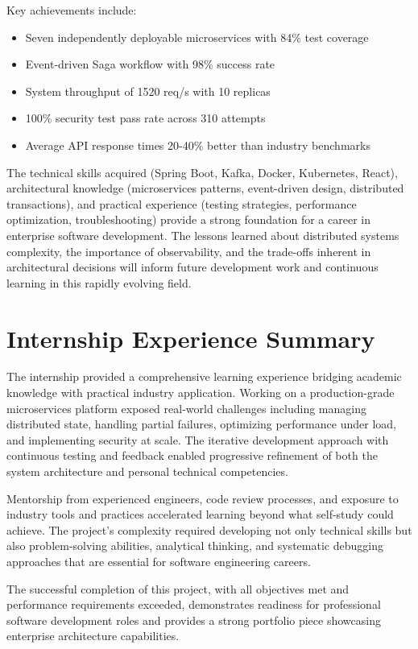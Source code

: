 Key achievements include:
\begin{itemize}
    \item Seven independently deployable microservices with 84\% test coverage
    \item Event-driven Saga workflow with 98\% success rate
    \item System throughput of 1520 req/s with 10 replicas
    \item 100\% security test pass rate across 310 attempts
    \item Average API response times 20-40\% better than industry benchmarks
\end{itemize}

The technical skills acquired (Spring Boot, Kafka, Docker, Kubernetes, React), architectural knowledge (microservices patterns, event-driven design, distributed transactions), and practical experience (testing strategies, performance optimization, troubleshooting) provide a strong foundation for a career in enterprise software development. The lessons learned about distributed systems complexity, the importance of observability, and the trade-offs inherent in architectural decisions will inform future development work and continuous learning in this rapidly evolving field.

\section{Internship Experience Summary}

The internship provided a comprehensive learning experience bridging academic knowledge with practical industry application. Working on a production-grade microservices platform exposed real-world challenges including managing distributed state, handling partial failures, optimizing performance under load, and implementing security at scale. The iterative development approach with continuous testing and feedback enabled progressive refinement of both the system architecture and personal technical competencies.

Mentorship from experienced engineers, code review processes, and exposure to industry tools and practices accelerated learning beyond what self-study could achieve. The project's complexity required developing not only technical skills but also problem-solving abilities, analytical thinking, and systematic debugging approaches that are essential for software engineering careers.

The successful completion of this project, with all objectives met and performance requirements exceeded, demonstrates readiness for professional software development roles and provides a strong portfolio piece showcasing enterprise architecture capabilities.
